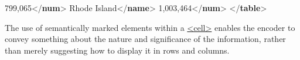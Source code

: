 \begin{shaded}
\hspace*{1em}\hspace*{1em}799,065{</\textbf{num}>}\mbox{}\newline 
\hspace*{1em}\mbox{}\newline 
{}\mbox{}\newline 
{}\mbox{}\newline 
\hspace*{1em}\mbox{}\newline 
\hspace*{1em}\hspace*{1em}Rhode Island{</\textbf{name}>}\mbox{}\newline 
\hspace*{1em}\mbox{}\newline 
\hspace*{1em}\mbox{}\newline 
\hspace*{1em}\hspace*{1em}1,003,464{</\textbf{num}>}\mbox{}\newline 
\hspace*{1em}\mbox{}\newline 
{}\mbox{}\newline 
{</\textbf{table}>}\end{shaded}\egroup\par \par
The use of semantically marked elements within a \hyperref[TEI.cell]{<cell>} enables the encoder to convey something about the nature and significance of the information, rather than merely suggesting how to display it in rows and columns.\par
